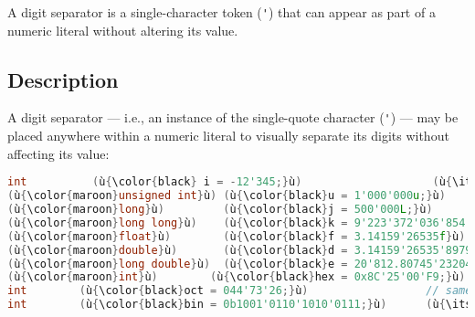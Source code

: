 \label{digit-separators}


A digit separator is a single-character token (\lstinline!'!) that can appear as part of a
numeric literal without altering its value.

\subsection[Description]{Description}\label{description}

A digit separator --- i.e., an instance of the single-quote
character (\lstinline!'!) --- may be placed anywhere within a numeric
literal to visually separate its digits without affecting its value:


\begin{lstlisting}[language=C++]
int          (ù{\color{black} i = -12'345;}ù)                    (ù{\itshape\color{skyblue}// same as}ù) (ù{\codeincomments{-12345}}ù)
(ù{\color{maroon}unsigned int}ù) (ù{\color{black}u = 1'000'000u;}ù)                 (ù{\itshape\color{skyblue}// same as}ù) (ù{\codeincomments{1000000u}}ù)
(ù{\color{maroon}long}ù)         (ù{\color{black}j = 500'000L;}ù)                   // same as (ù{\codeincomments{500000L}}ù)
(ù{\color{maroon}long long}ù)    (ù{\color{black}k = 9'223'372'036'854'775'807;}ù)  // same as (ù{\codeincomments{9223372036854775807}}ù)
(ù{\color{maroon}float}ù)        (ù{\color{black}f = 3.14159'26535f}ù)              // same as (ù{\codeincomments{3.1415926535f}}ù)
(ù{\color{maroon}double}ù)       (ù{\color{black}d = 3.14159'26535'89793;}ù)        (ù{\itshape\color{skyblue}// same as}ù) (ù{\codeincomments{3.141592653589793}}ù)
(ù{\color{maroon}long double}ù)  (ù{\color{black}e = 20'812.80745'23204}ù)          (ù{\itshape\color{skyblue}// same as}ù) (ù{\codeincomments{20812.8074523204}}ù)
(ù{\color{maroon}int}ù)        (ù{\color{black}hex = 0x8C'25'00'F9;}ù)              // same as (ù{\codeincomments{0x8C2500F9}}ù)
int        (ù{\color{black}oct = 044'73'26;}ù)                  // same as (ù{\codeincomments{0447326}}ù)
int        (ù{\color{black}bin = 0b1001'0110'1010'0111;}ù)      (ù{\itshape\color{skyblue}// same as}ù) (ù{\codeincomments{0b1001011010100111}}ù)
\end{lstlisting}

